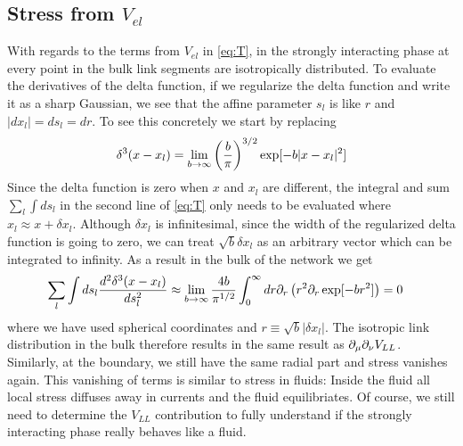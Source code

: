 \documentclass[nofootinbib,preprint,floatfix,titlepage,superscriptaddress]{revtex4} %
\begin{document}
\subsection{Stress from $V_{el}$}
With regards to the terms from $V_{el}$ in \eqref{eq:T}, in the strongly interacting phase at every point in the bulk link segments are isotropically distributed. 
To evaluate the derivatives of the delta function, if we regularize the delta function and write it as a sharp Gaussian, we see that the affine parameter $s_l$ is like $r$ and $|dx_l|= ds_l = dr$. 
To see this concretely we start by replacing
\[\delta^3(x-x_l) = \lim_{b\to \infty } \left({b \over\pi}\right)^{3/2} \exp[-b|x-x_l|^2]\]
Since the delta function is zero when $x$ and $x_l$ are different, the integral and sum $\sum_l\int ds_l$ in the second line of \eqref{eq:T} only needs to be evaluated where $x_l \approx x+\delta x_l $. 
Although $\delta x_l$ is infinitesimal, since the width of the regularized delta function is going to zero, we can treat $\sqrt{b}\delta x_l$ as an arbitrary vector which can be integrated to infinity. 
As a result in the bulk of the network we get 
\begin{align}\sum_l\int ds_l {d^2 \delta^3(x-x_l)\over ds_l^2} & \approx 
    \lim_{b\to \infty } {4b \over \pi^{1/2}} \int_0^\infty d r {\partial_r} \left(r^2 \partial_r \exp[-br^2]\right) = 0 
\end{align}
where we have used spherical coordinates and $r \equiv \sqrt{b} | \delta x_l| $.
The isotropic link distribution in the bulk therefore results in the same result as $  \partial_\mu \partial_\nu V_{LL}$.
Similarly, at the boundary, we still have the same radial part and stress vanishes again. 
This vanishing of terms is similar to stress in fluids: Inside the fluid all local stress diffuses away in currents and the fluid equilibriates. 
Of course, we still need to determine the $V_{LL}$ contribution to fully understand if the strongly interacting phase really behaves like a fluid. 
\end{document}
